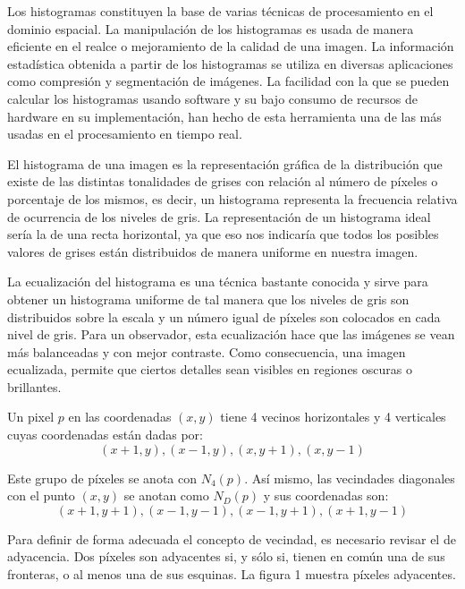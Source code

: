 Los histogramas constituyen la base de varias técnicas de procesamiento
en el dominio espacial. La manipulación de los histogramas es usada de
manera eficiente en el realce o mejoramiento de la calidad de una imagen.
La información estadística obtenida a partir de los histogramas se utiliza
en diversas aplicaciones como compresión y segmentación de imágenes. La
facilidad con la que se pueden calcular los histogramas usando software y
su bajo consumo de recursos de hardware en su implementación, han hecho de
esta herramienta una de las más usadas en el procesamiento en tiempo real.

El histograma de una imagen es la representación gráfica de la distribución
que existe de las distintas tonalidades de grises con relación al número de
píxeles o porcentaje de los mismos, es decir, un histograma representa la
frecuencia relativa de ocurrencia de los niveles de gris. La representación
de un histograma ideal sería la de una recta horizontal, ya que eso nos
indicaría que todos los posibles valores de grises están distribuidos de
manera uniforme en nuestra imagen.

La ecualización del histograma es una técnica bastante conocida y sirve para
obtener un histograma uniforme de tal manera que los niveles de gris son
distribuidos sobre la escala y un número igual de píxeles son colocados en
cada nivel de gris. Para un observador, esta ecualización hace que las imágenes
se vean más balanceadas y con mejor contraste. Como consecuencia, una imagen
ecualizada, permite que ciertos detalles sean visibles en regiones oscuras o
brillantes.

Un pixel $p$ en las coordenadas $(x, y)$ tiene 4 vecinos horizontales y 4
verticales cuyas coordenadas están dadas por:
\begin{equation}
    (x+1,y), (x-1,y), (x,y+1), (x,y-1)
\end{equation}

Este grupo de píxeles se anota con $N_{4}(p)$. Así mismo, las vecindades
diagonales con el punto $(x,y)$ se anotan como $N_{D}(p)$ y sus coordenadas son:
\begin{equation}
    (x+1,y+1), (x-1, y-1), (x-1,y+1), (x+1, y-1)
\end{equation}

Para definir de forma adecuada el concepto de vecindad, es necesario revisar el
de adyacencia. Dos píxeles son adyacentes si, y sólo si, tienen en común una de
sus fronteras, o al menos una de sus esquinas. La figura 1 muestra píxeles adyacentes.

